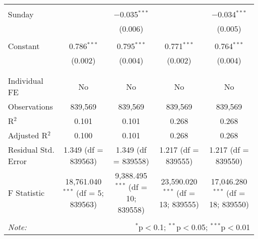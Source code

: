 \documentclass[
]{article}
\begin{document}
\begin{table}[!htbp]
{\begin{tabular}{@{\extracolsep{5pt}}lcccc}
  & & & & \\ 
 Sunday &  & $-$0.035$^{***}$ &  & $-$0.034$^{***}$ \\ 
  &  & (0.006) &  & (0.005) \\ 
  & & & & \\ 
 Constant & 0.786$^{***}$ & 0.795$^{***}$ & 0.771$^{***}$ & 0.764$^{***}$ \\ 
  & (0.002) & (0.004) & (0.002) & (0.004) \\ 
  & & & & \\ 
\hline \\[-1.8ex] 
Individual FE & No & No & No & No \\ 
Observations & 839,569 & 839,569 & 839,569 & 839,569 \\ 
R$^{2}$ & 0.101 & 0.101 & 0.268 & 0.268 \\ 
Adjusted R$^{2}$ & 0.100 & 0.101 & 0.268 & 0.268 \\ 
Residual Std. Error & 1.349 (df = 839563) & 1.349 (df = 839558) & 1.217 (df = 839555) & 1.217 (df = 839550) \\ 
F Statistic & 18,761.040$^{***}$ (df = 5; 839563) & 9,388.495$^{***}$ (df = 10; 839558) & 23,590.020$^{***}$ (df = 13; 839555) & 17,046.280$^{***}$ (df = 18; 839550) \\ 
\hline 
\hline \\[-1.8ex] 
\textit{Note:}  & \multicolumn{4}{r}{$^{*}$p$<$0.1; $^{**}$p$<$0.05; $^{***}$p$<$0.01} \\ 
\end{tabular}
} 
\end{table} 
\newpage
\end{document}
